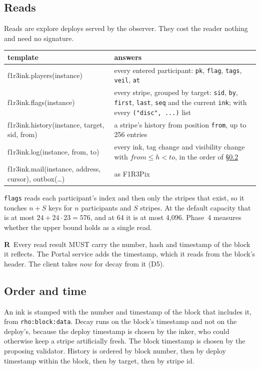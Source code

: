 \documentclass[11pt,a4paper]{article}
\newcommand{\code}[1]{\texttt{#1}}
\newcommand{\MUST}{{\fontsize{0.82em}{1em}\selectfont MUST}}
\newcounter{req}
\newcommand{\req}[1]{\refstepcounter{req}\label{#1}\textbf{R\thereq}}
\begin{document}
\subsection{Reads}\label{sec:reads}

Reads are explore deploys served by the observer. They cost the reader nothing and need no
signature.

\begin{center}\small
\begin{tabularx}{\linewidth}{@{}>{\ttfamily}l X@{}}
\toprule
\normalfont template & answers\\
\midrule
f1r3ink.players(instance)   & every entered participant: \code{pk}, \code{flag}, \code{tags}, \code{veil}, \code{at}\\
f1r3ink.flags(instance)     & every stripe, grouped by target: \code{sid}, \code{by}, \code{first}, \code{last}, \code{seq} and the current \code{ink}; with every \code{("disc", ...)} list\\
f1r3ink.history(instance, target, sid, from) & a stripe's history from position \code{from}, up to 256 entries\\
f1r3ink.log(instance, from, to) & every ink, tag change and visibility change with $\mathit{from}\le h<\mathit{to}$, in the order of \S\ref{sec:order}\\
f1r3ink.mail(instance, address, cursor), outbox(\ldots) & as F1R3Pix\\
\bottomrule
\end{tabularx}
\end{center}

\code{flags} reads each participant's index and then only the stripes that exist, so it touches
$n + S$ keys for $n$ participants and $S$ stripes. At the default capacity that is at most
$24 + 24\cdot 23 = 576$, and at 64 it is at most 4{,}096. Phase~4 measures whether the upper
bound holds as a single read.

\req{r:now}~Every read result \MUST{} carry the number, hash and timestamp of the block it
reflects. The Portal service adds the timestamp, which it reads from the block's header. The
client takes $\mathit{now}$ for decay from it (D5).

\subsection{Order and time}\label{sec:order}

An ink is stamped with the number and timestamp of the block that includes it, from
\code{rho:block:data}. Decay runs on the block's timestamp and not on the deploy's, because the
deploy timestamp is chosen by the inker, who could otherwise keep a stripe artificially fresh.
The block timestamp is chosen by the proposing validator. History is ordered by block number,
then by deploy timestamp within the block, then by target, then by stripe id.
\end{document}
